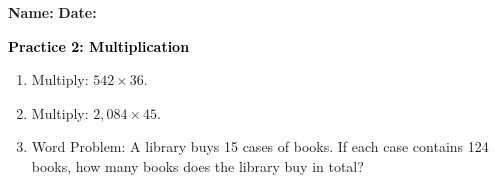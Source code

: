 \documentclass[12pt, letterpaper, fleqn]{article}
\begin{document}
\textbf{Name:} \underline{\hspace{5cm}}
\hfill
\textbf{Date:} \underline{\hspace{3cm}}\\

\begin{tcolorbox}[colback=customteal!20]
    \large\textcolor{black}{\textbf{Practice 2: Multiplication}}
\end{tcolorbox}
\begin{enumerate}[itemsep=3.5cm, leftmargin=0.6cm]
\item Multiply: $542 \times 36$.
\vspace{3.5cm}
\item Multiply: $2,084 \times 45$.
\vspace{3.5cm}
\item Word Problem: A library buys 15 cases of books. If each case contains 124 books, how many books does the library buy in total?
\end{enumerate}
\end{document}
